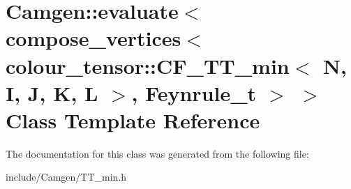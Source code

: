 \hypertarget{a00164}{}\section{Camgen\+:\+:evaluate$<$ compose\+\_\+vertices$<$ colour\+\_\+tensor\+:\+:C\+F\+\_\+\+T\+T\+\_\+min$<$ N, I, J, K, L $>$, Feynrule\+\_\+t $>$ $>$ Class Template Reference}
\label{a00164}


The documentation for this class was generated from the following file\+:\begin{DoxyCompactItemize}
\item 
include/\+Camgen/T\+T\+\_\+min.\+h\end{DoxyCompactItemize}
